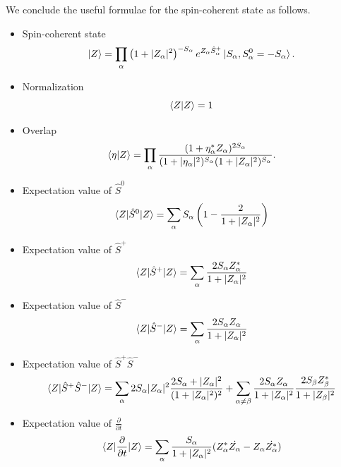 \documentclass[11pt]{book} %
\begin{document}
We conclude the useful formulae for the spin-coherent state as follows.
\begin{framed}
  \begin{itemize}
 \item Spin-coherent state 
\begin{equation}
	\ket{Z} = \prod_{\alpha} \left(1+|Z_{\alpha}|^2\right)^{-S_{\alpha}}
	e^{Z_{\alpha} \hat{S}_{\alpha}^{+}} \ket{S_{\alpha}, S_{\alpha}^0=-S_{\alpha}} .%
\end{equation}
 \item Normalization
\begin{equation}
	\braket{Z|Z} = 1
\end{equation}
 \item Overlap
\begin{equation}
	  \braket{\eta|Z} = \prod_{\alpha} \frac{(1+\eta_{\alpha}^*Z_{\alpha})^{2S_{\alpha}}}{(1+|\eta_{\alpha}|^2)^{S_{\alpha}}(1+|Z_{\alpha}|^2)^{S_{\alpha}}} .
  \label{overlap}
\end{equation}
 \item Expectation value of $\hat{S}^0$
\begin{equation}
     \braket{Z|\hat{S}^0|Z} = \sum_{\alpha} S_{\alpha}\left( 1-\frac{2}{1+|Z_{\alpha}|^2} \right)
\end{equation}
 \item Expectation value of $\hat{S}^+$
\begin{equation}
     \braket{Z|\hat{S}^+|Z} = \sum_{\alpha} \frac{2S_{\alpha}Z_{\alpha}^*}{1+|Z_{\alpha}|^2}
\end{equation}
 \item Expectation value of $\hat{S}^-$
\begin{equation}
     \braket{Z|\hat{S}^-|Z} = \sum_{\alpha} \frac{2S_{\alpha}Z_{\alpha}}{1+|Z_{\alpha}|^2}
\end{equation}
 \item Expectation value of $\hat{S}^+\hat{S}^-$
\begin{equation}
    \braket{Z|\hat{S}^+\hat{S}^-|Z} = \sum_{\alpha} 2S_{\alpha}|Z_{\alpha}|^2\frac{2S_{\alpha}+|Z_{\alpha}|^2}{(1+|Z_{\alpha}|^2)^2}
    + \sum_{\alpha \neq \beta} \frac{2S_{\alpha}Z_{\alpha}}{1+|Z_{\alpha}|^2}\frac{2S_{\beta}Z_{\beta}^*}{1+|Z_{\beta}|^2}
\end{equation}
 \item Expectation value of $\frac{\partial}{\partial t}$
\begin{equation}
       \braket{Z|\frac{\partial}{\partial t}|Z} = \sum_{\alpha} \frac{S_{\alpha}}{1+|Z_{\alpha}|^2}(Z_{\alpha}^*\dot{Z_{\alpha}}-Z_{\alpha}\dot{Z_{\alpha}^*})
	\label{ddt}
\end{equation}
\end{itemize}
\end{framed}
\end{document}
